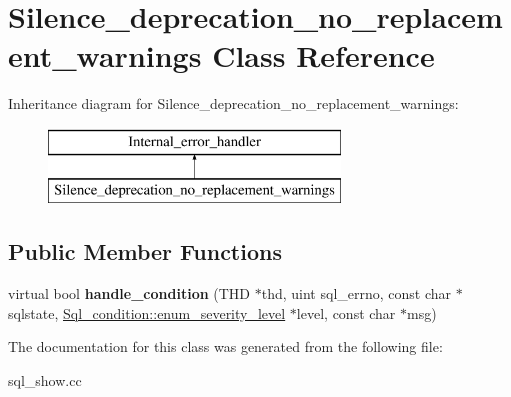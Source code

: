 \hypertarget{classSilence__deprecation__no__replacement__warnings}{}\section{Silence\+\_\+deprecation\+\_\+no\+\_\+replacement\+\_\+warnings Class Reference}
\label{classSilence__deprecation__no__replacement__warnings}
Inheritance diagram for Silence\+\_\+deprecation\+\_\+no\+\_\+replacement\+\_\+warnings\+:\begin{figure}[H]
\begin{center}
\leavevmode
\includegraphics[height=2.000000cm]{classSilence__deprecation__no__replacement__warnings}
\end{center}
\end{figure}
\subsection*{Public Member Functions}
\begin{DoxyCompactItemize}
\item 
\mbox{\label{classSilence__deprecation__no__replacement__warnings_a64b9fe19fef2bdc7a70a373bcde83a6a}} 
virtual bool {\bfseries handle\+\_\+condition} (T\+HD $\ast$thd, uint sql\+\_\+errno, const char $\ast$sqlstate, \mbox{\hyperlink{classSql__condition_ab0602581e19cddb609bfe10c44be4e83}{Sql\+\_\+condition\+::enum\+\_\+severity\+\_\+level}} $\ast$level, const char $\ast$msg)
\end{DoxyCompactItemize}


The documentation for this class was generated from the following file\+:\begin{DoxyCompactItemize}
\item 
sql\+\_\+show.\+cc\end{DoxyCompactItemize}
